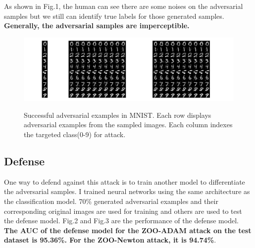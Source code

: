 \documentclass[a4paper]{article}
\begin{document}
As shown in Fig.1, the human can see there are some noises on the adversarial samples but we still can identify true labels for those generated samples. \textbf{Generally, the adversarial samples are imperceptible.}
\begin{figure}
\centering
\includegraphics[scale=0.3]{resjpg.jpg}
\label{ae}
\caption{Successful adversarial examples in MNIST. Each row displays adversarial examples from the sampled images. Each column indexes the targeted class(0-9) for attack.}
\end{figure}

\subsection{Defense}
One way to defend against this attack is to train another model to differentiate the adversarial samples.
I trained neural networks using the same architecture as the classification model. 70\% generated adversarial examples and their corresponding original images are used for training and others are used to test the defense model. 
Fig.2 and Fig.3 are the performance of the defense model. \textbf{The AUC of the defense model for the ZOO-ADAM attack on the test dataset is 95.36\%. For the ZOO-Newton attack, it is 94.74\%}.
\end{document}
